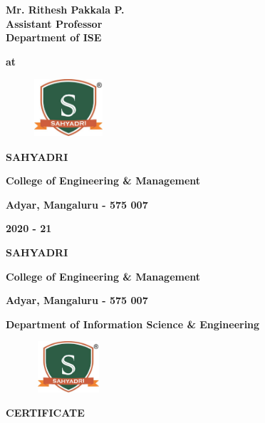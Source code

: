 \documentclass[12pt,a4paper]{report}
\begin{document}
\begin{center}
\vspace{6pt}
\textbf{\large Mr. Rithesh Pakkala P.}\\
\normalsize\textbf{ Assistant Professor}\\
\normalsize\textbf{Department of ISE}\\
\par
\vspace{0.5pt}
\normalsize \centering \textbf{at}\\
\begin{figure}[hbtp]
\centering
\includegraphics[width=1.0in,height=0.85in]{../fig/sahyadri}
\end{figure}
{\LARGE \textbf{SAHYADRI}}
\par
\vspace{6pt}
{\large \textbf{College of Engineering \& Management}}
\par
\vspace{3pt}
{\large \textbf{Adyar, Mangaluru - 575 007}}
\par
\vspace{3pt}
{\large \textbf{2020 - 21}}

\newpage

{\LARGE \textbf{SAHYADRI}}
\par
\vspace{6pt}
{\Large \textbf{College of Engineering \& Management}}
\par
\vspace{3pt}
{\large \textbf{Adyar, Mangaluru - 575 007}}
\par
\vspace{0.25in}
{\large \textbf{Department of Information Science \& Engineering}}
\par
\begin{figure}[hbtp]
\centering
\includegraphics[width=1.0in,height=0.75in]{../fig/sahyadri}
\end{figure}
{\Large \textbf{CERTIFICATE}}
\end{center}
\par
\vspace{0.10in}
\end{document}
